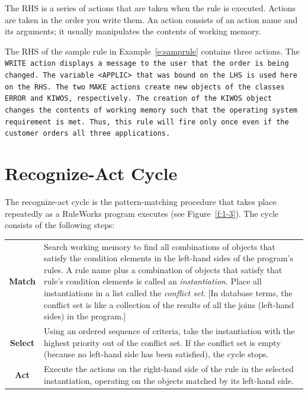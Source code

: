 The RHS is a series of actions that are taken when the rule is
executed. Actions are taken in the order you write them. An action
consists of an action name and its arguments; it usually manipulates
the contents of working memory.

The RHS of the sample rule in Example~\ref{e:samprule} contains three
actions. The \tt{WRITE} action displays a message to the user that the
order is being changed. The variable \tt{<APPLIC>} that was bound on
the LHS is used here on the RHS. The two \tt{MAKE} actions create new
objects of the classes \tt{ERROR} and \tt{KIWOS}, respectively. The
creation of the \tt{KIWOS} object changes the contents of working
memory such that the operating system requirement is met. Thus, this
rule will fire only once even if the customer orders all three
applications.

\section{Recognize-Act Cycle}

The recognize-act cycle is the pattern-matching procedure that takes
place repeatedly as a RuleWorks program executes (see
Figure~\ref{f:1-3}). The cycle consists of the following steps:

\begin{center}
  \begin{tabularx}{\columnwidth}{cX}
    \textbf{Match}  & Search working memory to find
                      all combinations of objects
                      that satisfy the condition  
                      elements in the left-hand sides 
                      of the program's rules. A rule 
                      name plus a combination of     
                      objects that satisfy that     
                      rule's condition elements is    
                      called an \emph{instantiation}. Place 
                      all instantiations in a list   
                      called the \emph{conflict set}. [In   
                      database terms, the conflict    
                      set is like a collection of the 
                      results of all the joins        
                      (left-hand sides) in the
                      program.] \\\addlinespace
    \textbf{Select} & Using an ordered sequence of  
                      criteria, take the             
                      instantiation with the highest 
                      priority out of the conflict    
                      set. If the conflict set is     
                      empty (because no left-hand     
                      side has been satisfied), the   
                      cycle stops. \\\addlinespace
    \textbf{Act}    & Execute the actions on the      
                      right-hand side of the rule in  
                      the selected instantiation,     
                      operating on the objects       
                      matched by its left-hand side. 
  \end{tabularx}
\end{center}

